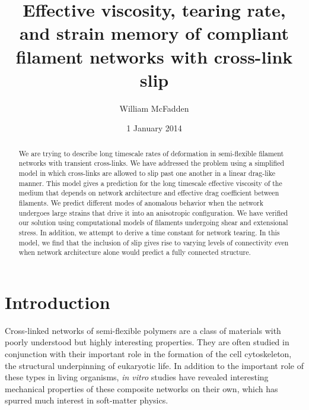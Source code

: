 \documentclass[pre,reprint]{revtex4-1}
\begin{document}
\title{Effective viscosity, tearing rate, and strain memory of compliant filament networks with cross-link slip}
\author{William McFadden}

\date{1 January 2014}

\begin{abstract}
We are trying to describe long timescale rates of deformation in semi-flexible filament networks with transient cross-links.  We have addressed the problem using a simplified model in which cross-links are allowed to slip past one another in a linear drag-like manner.  This model gives a prediction for the long timescale effective viscosity of the medium that depends on network architecture and effective drag coefficient between filaments.  We predict different modes of anomalous behavior when the network undergoes large strains that drive it into an anisotropic configuration.  We have verified our solution using computational models of filaments undergoing shear and extensional stress.  In addition, we attempt to derive a time constant for network tearing.  In this model, we find that the inclusion of slip gives rise to varying levels of connectivity even when network architecture alone would predict a fully connected structure.
\end{abstract}

\maketitle


\tableofcontents


















\section{Introduction}

Cross-linked networks of semi-flexible polymers are a class of materials with poorly understood but highly interesting properties.  They are often studied in conjunction with their important role in the formation of the cell cytoskeleton, the structural underpinning of eukaryotic life.   In addition to the important role of these types in living organisms\cite{cellmech_review1,cellmech_review2}, {\em in vitro} studies have revealed interesting mechanical properties of these composite networks on their own, which has spurred much interest in soft-matter physics\cite{megareview}.  
\end{document}
